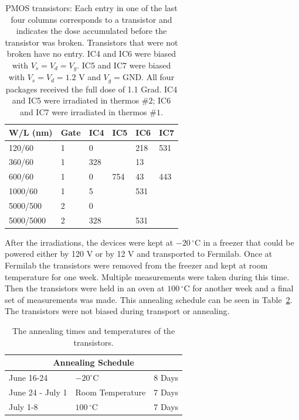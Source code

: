 \begin{table}
\begin{center}
\caption{PMOS transistors: Each entry in one of the last four columns corresponds to a transistor and indicates the dose accumulated before the transistor was broken. Transistors that were not broken have no entry.
IC4 and IC6 were biased with $V_s=V_d=V_g$. IC5 and IC7 were biased with $V_s=V_d=1.2$ V and $V_g=$GND.
All four packages received the full dose of 1.1 Grad.  IC4 and IC5 were irradiated in thermos $\#2$; IC6 and IC7 were irradiated in thermos $\#1$.}
\begin{tabular}{| p{2cm} | p{1cm} | p{2cm} | p{2cm} | p{2cm} | p{2cm} |}
\hline
W/L (nm) & Gate & IC4 & IC5 & IC6 & IC7 \\ \hline
\hline
120/60 & 1 & 0 & & 218 & 531\\ \hline
360/60 & 1 & 328 & & 13 & \\ \hline
600/60 & 1 & 0 & 754 & 43 & 443 \\ \hline
1000/60 & 1 & 5 & & 531 & \\ \hline
5000/500 & 2 & 0 & & & \\ \hline
5000/5000 & 2 & 328 & & 531 & \\ \hline
\end{tabular}
\label{tab:pmosbroken}
\end{center}
\end{table}

After the irradiations, the devices were kept at $-20\,^{\circ}$C in a freezer that could be powered either by 120 V or by 12 V and transported to Fermilab. 
Once at Fermilab the transistors were removed from the freezer and kept at room temperature for one week.   Multiple measurements were taken during this time. Then the transistors were held in an oven at $100\,^{\circ}$C for another week and a final set of measurements was made. This annealing schedule can be seen in Table~\ref{tab:Annealing_Schedule}. The transistors were not biased during transport or annealing.

\begin{table}
\begin{center}
\caption{The annealing times and temperatures of the transistors.}
\begin{tabular}{| p{3cm} | p{3cm} | p{3cm} | }
\hline
\multicolumn{3}{|c|}{Annealing Schedule} \\
\hline
June 16-24 & $-20^{\circ}$C & 8 Days\\ \hline
June 24 - July 1 & Room Temperature & 7 Days\\ \hline
July 1-8 & $100\,^{\circ}$C & 7 Days\\
\hline
\end{tabular}
\label{tab:Annealing_Schedule}
\end{center}
\end{table} 